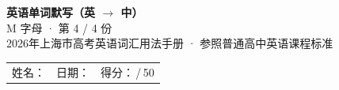 \documentclass[10pt,a4paper]{article}
\begin{document}
\pagestyle{plain}

\begin{center}
{\LARGE\bfseries 英语单词默写（英 $\to$ 中）}\\[0.22em]
{\large M 字母 · 第 4 / 4 份}\\[0.18em]
{\small 2026年上海市高考英语词汇用法手册 · 参照普通高中英语课程标准}
\end{center}

\vspace{0.25em}
\noindent\begin{tabular}{@{}p{}@{}p{}@{}p{}@{}}
姓名：\underline{\hspace{2.0cm}} & 日期：\underline{\hspace{2.0cm}} & 得分：\underline{\hspace{1.3cm}}\,/\,50 \\
\end{tabular}

\vspace{0.3em}

\vspace{0.08em}
\end{document}
